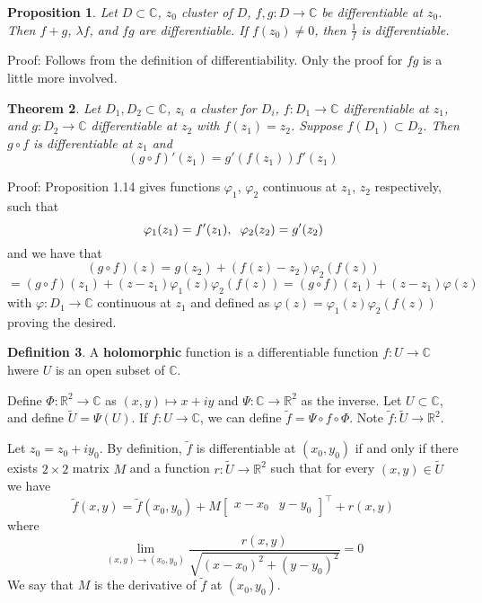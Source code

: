 \documentclass[11pt]{article}
\theoremstyle{plain}
\newtheorem{theorem}{Theorem}[section]
\newtheorem{proposition}[theorem]{Proposition}
\theoremstyle{definition}
\newtheorem{definition}[theorem]{Definition}
\begin{document}
\begin{proposition}
Let $D \subset \mathbb{C}$, $z_0$ cluster of $D$, $f, g: D \to \mathbb{C}$ be differentiable at $z_0$. Then $f+g$, $\lambda f$, and $fg$ are differentiable. If $f(z_0) \neq 0$, then $\frac{1}{f}$ is differentiable.
\end{proposition}

Proof: Follows from the definition of differentiability. Only the proof for $fg$ is a little more involved. 

\begin{theorem}
Let $D_1, D_2 \subset \mathbb{C}$, $z_i$ a cluster for $D_i$, $f: D_{1} \to \mathbb{C}$ differentiable at $z_1$, and $g: D_2 \to \mathbb{C}$ differentiable at $z_2$ with $f(z_1) = z_2$. Suppose $f(D_1) \subset D_2$. Then $g \circ f$ is differentiable at $z_1$ and 
$$ (g \circ f)'(z_1) = g'(f(z_1)) f'(z_1) $$
\end{theorem}

Proof: Proposition 1.14 gives functions $\varphi_1$, $\varphi_2$ continuous at $z_1$, $z_2$ respectively, such that 
$$ \varphi_1(z_1) = f'(z_1), \hspace{2mm} \varphi_2(z_2) = g'(z_2) $$
and we have that 
$$ (g \circ f)(z) = g(z_2) + (f(z) - z_2)\varphi_2(f(z)) $$
$$ = (g \circ f)(z_1) + (z - z_1)\varphi_1(z)\varphi_2(f(z)) = (g \circ f)(z_1) + (z - z_1)\varphi(z)$$
with $\varphi: D_1 \to \mathbb{C}$ continuous at $z_1$ and defined as $\varphi(z) = \varphi_1(z)\varphi_2(f(z))$ proving the desired.
\newline

\begin{definition}
A \textbf{holomorphic} function is a differentiable function $f: U \to \mathbb{C}$ hwere $U$ is an open subset of $\mathbb{C}$.
\end{definition}

\vspace{5mm}
\noindent
Define $\Phi: \mathbb{R}^{2} \to \mathbb{C}$ as $(x, y) \mapsto x + iy$ and $\Psi : \mathbb{C} \to \mathbb{R}^2$ as the inverse. Let $U \subset \mathbb{C}$, and define $\tilde{U} = \Psi(U)$. If $f: U \to \mathbb{C}$, we can define $\tilde{f} = \Psi \circ f \circ \Phi$. Note $\tilde{f} : \tilde{U} \to \mathbb{R}^{2}$.

\vspace{5mm}
\noindent
Let $z_0 = z_0 + iy_0$. By definition, $\tilde{f}$ is differentiable at $(x_0, y_0)$ if and only if there exists $2 \times 2$ matrix $M$ and a function $r: \tilde{U} \to \mathbb{R}^2$ such that for every $(x, y) \in \tilde{U}$ we have 
$$ \tilde{f}(x, y) = \tilde{f}(x_0, y_0) + M\begin{bmatrix} x - x_0 & y - y_0 \end{bmatrix}^{\top} + r(x, y) $$
where 
$$ \lim_{(x, y) \to (x_0, y_0)} \frac{r(x, y)}{\sqrt{(x - x_0)^2 + (y - y_0)^2}} = 0$$
We say that $M$ is the derivative of $\tilde{f}$ at $(x_0, y_0)$.
\end{document}
